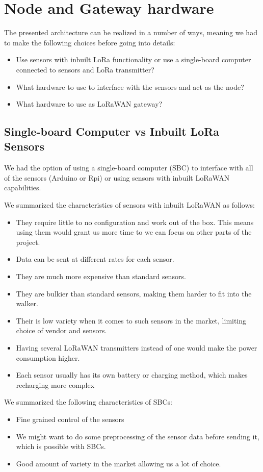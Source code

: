 \section{Node and Gateway hardware}
	The presented architecture can be realized in a number of ways, meaning we had to make the following choices before going into details:

	\begin{itemize}
		\item Use sensors with inbuilt LoRa functionality or use a single-board computer connected to sensors and LoRa transmitter?
		\item What hardware to use to interface with the sensors and act as the node?
		\item What hardware to use as LoRaWAN gateway?
	\end{itemize}


	\subsection{Single-board Computer vs Inbuilt LoRa Sensors}

		We had the option of using a single-board computer (SBC) to interface with all of the sensors (Arduino or Rpi) or using sensors with inbuilt LoRaWAN capabilities.

		We summarized the characteristics of sensors with inbuilt LoRaWAN as follows:
		\begin{itemize}
			\item They require little to no configuration and work out of the box. This means using them would grant us more time to we can focus on other parts of the project.
			\item Data can be sent at different rates for each sensor.
			\item They are much more expensive than standard sensors.
			\item They are bulkier than standard sensors, making them harder to fit into the walker.
			\item Their is low variety when it comes to such sensors in the market, limiting choice of vendor and sensors.
			\item Having several LoRaWAN transmitters instead of one would make the power consumption higher.
			\item Each sensor usually has its own battery or charging method, which makes recharging more complex
		\end{itemize}


		We summarized the following characteristics of SBCs:
		\begin{itemize}
			\item Fine grained control of the sensors
			\item We might want to do some preprocessing of the sensor data before sending it, which is possible with SBCs.
			\item Good amount of variety in the market allowing us a lot of choice.
		\end{itemize}

